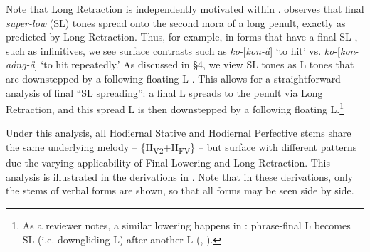 \documentclass[output=paper
,newtxmath
,modfonts
,nonflat]{langsci/langscibook}
\begin{document}
Note that Long Retraction is independently motivated within . \citet{Roberts-Kohno2014} observes that final \textit{super-low} (SL) tones spread onto the second mora of a long penult, exactly as predicted by Long Retraction. Thus, for example, in forms that have a final SL , such as infinitives, we see surface contrasts such as \textit{ko}-[\textit{kon-ȁ}] ‘to hit’ vs. \textit{ko}-[\textit{kon}-\textit{aȁng-ȁ}] ‘to hit repeatedly.’ As discussed in §4, we view SL tones as L tones that are downstepped by a following floating L \citep[c.f.][]{Clements1981}. This allows for a straightforward analysis of final “SL spreading”: a final L spreads to the penult via Long Retraction, and this spread L is then downstepped by a following floating L.\footnote{As a reviewer notes, a similar lowering happens in : phrase-final L becomes SL (i.e. downgliding L) after another L (\citealt[10]{Mwita2008}, \citealt{Marlo2014}).}

Under this analysis, all Hodiernal Stative and Hodiernal Perfective stems share the same underlying melody – \{H\textsubscript{V2}+H\textsubscript{FV}\} – but surface with different  patterns due the varying applicability of Final Lowering and Long Retraction. This analysis is illustrated in the derivations in . Note that in these derivations, only the stems of verbal forms are shown, so that all forms may be seen side by side.

\begin{table}
\caption{Derivations of forms with underlying \{H\textsubscript{V2} + H\textsubscript{FV}\} melodies}
\label{tab:jones:5}
\end{table}
 
\end{document}
